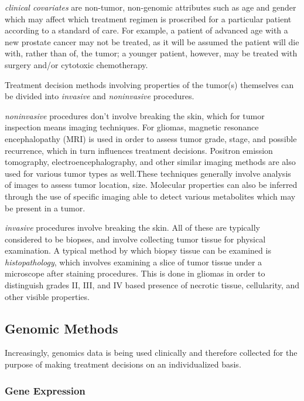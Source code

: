       \textit{clinical covariates} are non-tumor, non-genomic attributes such as age and gender
      which may affect which treatment regimen is proscribed for a
      particular patient according to a standard of care. For example,
      a patient of advanced age with a new prostate cancer may not be
      treated, as it will be assumed the patient will die with, rather
      than of, the tumor; a younger patient, however, may be treated
      with surgery and/or cytotoxic chemotherapy.

      Treatment decision methods involving properties of the tumor(s)
      themselves can be divided into \textit{invasive} and
      \textit{noninvasive} procedures.

      \textit{noninvasive} procedures don't involve breaking the skin,
      which for tumor inspection means imaging techniques. For
      gliomas, magnetic resonance encephalopathy (MRI) is used in
      order to assess tumor grade, stage, and possible recurrence, which in turn influences
      treatment decisions. Positron emission tomography,
      electroencephalography, and other similar imaging methods are
      also used for various tumor types as well.These techniques
      generally involve analysis of images to assess tumor location,
      size. Molecular properties can also be inferred through the use
      of specific imaging able to detect various metabolites which may
      be present in a tumor. 

      \textit{invasive} procedures involve breaking the skin. All of
      these are typically considered to be biopses, and involve
      collecting tumor tissue for physical examination. A typical
      method by which biopsy tissue can be examined is
      \textit{histopathology}, which
      involves examining a slice of tumor tissue under a microscope
      after staining procedures. This is done in gliomas in order to
      distinguish grades II, III, and IV based presence of necrotic
      tissue, cellularity, and other visible properties.

      \subsection{Genomic Methods}

      Increasingly, genomics data is being used clinically and
      therefore collected for the purpose of making treatment
      decisions on an individualized basis.

      \subsubsection{Gene Expression}

